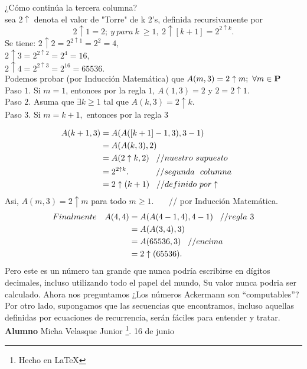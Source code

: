 \documentclass{article}
\begin{document}
¿Cómo continúa la tercera columna?\\
sea $2\uparrow$ denota el valor de "Torre" de k 2's, definida recursivamente por 
$$2\uparrow 1= 2;~ y~ para~ k ~\geq 1,~ 2\uparrow [k+1]= 2^{2\uparrow k}.$$
Se tiene: \hspace{3,1cm} $2 \uparrow 2 = 2^{2 \uparrow 1} = 2^{2} = 4,$\\
\hspace*{4,65cm}$2 \uparrow 3 = 2^{2 \uparrow 2} = 2^{4} = 16,$\\
\hspace*{4,65cm}$2 \uparrow 4 = 2^{2 \uparrow 3} = 2^{16} = 65536.$\\

Podemos probar (por Inducción Matemática) que $A(m,3) = 2 \uparrow m;  ~ \forall m \in \bf{P}$ \\

Paso $1$. Si $m = 1$, entonces por la regla $1$, $A(1,3) = 2$ y $2 = 2\uparrow 1.$\\
Paso $2$. Asuma que $\exists k \geq 1$ tal que $A(k,3) = 2 \uparrow k.$\\
Paso $3$. Si $m = k+1,$ entonces por la regla 3 

\begin{align*}
					A(k+1,3)    &= A(A([k+1]-1,3),3-1)\\
							    &= A(A(k,3),2)\\
							    &= A(2 \uparrow k,2) \hspace*{0.3cm} //nuestro ~supuesto\\
							    &= 2^{2 \uparrow k}.~~~~~~~~~~// segunda ~~columna \hspace*{0.6cm}\\
							    &= 2 \uparrow(k+1) \hspace{0.3cm}// definido ~por \uparrow\\
\end{align*}
Asi, $A(m,3) = 2 \uparrow m$ para todo $m \geq 1$.~~~ // por Inducción Matemática.\\
\begin{align*}				    
Finalmente ~~~	A(4,4)  &= A(A(4-1,4),4-1) \hspace*{0.3cm} //regla~3\\
							    &= A(A(3,4),3)\\
							    &= A(65536,3) \hspace*{0.3cm} //encima\\
							    &= 2 \uparrow (65536).\\						    
\end{align*}
Pero este es un número tan grande que nunca podría escribirse en dígitos decimales, incluso utilizando todo el papel del mundo, Su valor nunca podria ser calculado. Ahora nos preguntamos ¿Los números Ackermann son “computables”? Por otro lado, supongamos que las secuencias que encontramos, incluso aquellas definidas por ecuaciones de recurrencia, serán fáciles para entender y tratar.
\vfill \textbf{Alumno} Micha Velasque Junior \footnote{Hecho en \LaTeX}.
\hfill 16 de junio
\end{document}
